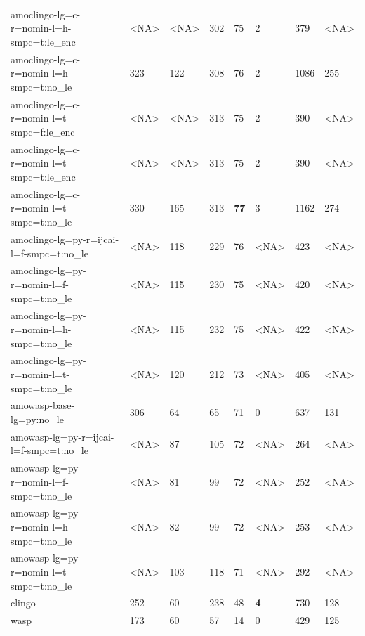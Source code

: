 \documentclass{article}
\begin{document}
\begin{table}[t!]
\begin{tabular}{llllllll}
amoclingo-lg=c-r=nomin-l=h-smpc=t:le\_enc & <NA> & <NA> & 302 & 75 & 2 & 379 & <NA> \\
amoclingo-lg=c-r=nomin-l=h-smpc=t:no\_le & 323 & 122 & 308 & 76 & 2 & 1086 & 255 \\
amoclingo-lg=c-r=nomin-l=t-smpc=f:le\_enc & <NA> & <NA> & 313 & 75 & 2 & 390 & <NA> \\
amoclingo-lg=c-r=nomin-l=t-smpc=t:le\_enc & <NA> & <NA> & 313 & 75 & 2 & 390 & <NA> \\
amoclingo-lg=c-r=nomin-l=t-smpc=t:no\_le & 330 & 165 & 313 & \textbf{77} & 3 & 1162 & 274 \\
amoclingo-lg=py-r=ijcai-l=f-smpc=t:no\_le & <NA> & 118 & 229 & 76 & <NA> & 423 & <NA> \\
amoclingo-lg=py-r=nomin-l=f-smpc=t:no\_le & <NA> & 115 & 230 & 75 & <NA> & 420 & <NA> \\
amoclingo-lg=py-r=nomin-l=h-smpc=t:no\_le & <NA> & 115 & 232 & 75 & <NA> & 422 & <NA> \\
amoclingo-lg=py-r=nomin-l=t-smpc=t:no\_le & <NA> & 120 & 212 & 73 & <NA> & 405 & <NA> \\
amowasp-base-lg=py:no\_le & 306 & 64 & 65 & 71 & 0 & 637 & 131 \\
amowasp-lg=py-r=ijcai-l=f-smpc=t:no\_le & <NA> & 87 & 105 & 72 & <NA> & 264 & <NA> \\
amowasp-lg=py-r=nomin-l=f-smpc=t:no\_le & <NA> & 81 & 99 & 72 & <NA> & 252 & <NA> \\
amowasp-lg=py-r=nomin-l=h-smpc=t:no\_le & <NA> & 82 & 99 & 72 & <NA> & 253 & <NA> \\
amowasp-lg=py-r=nomin-l=t-smpc=t:no\_le & <NA> & 103 & 118 & 71 & <NA> & 292 & <NA> \\
clingo & 252 & 60 & 238 & 48 & \textbf{4} & 730 & 128 \\
wasp & 173 & 60 & 57 & 14 & 0 & 429 & 125 \\
\bottomrule
\end{tabular}
\end{table}

            
\end{document}
